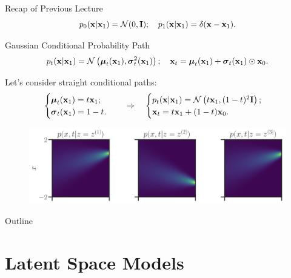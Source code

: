 \documentclass{beamer}
\begin{document}
\begin{frame}{Recap of Previous Lecture}
	\[
		p_0(\mathbf{x} | \mathbf{x}_1) = \mathcal{N}(0, \mathbf{I}); \quad p_1(\mathbf{x} | \mathbf{x}_1) = \delta(\mathbf{x} - \mathbf{x}_1).
	\]
	
	\begin{block}{Gaussian Conditional Probability Path}
		\vspace{-0.5cm}
		\[
			p_t(\mathbf{x} | \mathbf{x}_1) = \mathcal{N}\left(\boldsymbol{\mu}_t(\mathbf{x}_1), \boldsymbol{\sigma}_t^2(\mathbf{x}_1)\right); \quad \mathbf{x}_t = \boldsymbol{\mu}_t(\mathbf{x}_1) +  \boldsymbol{\sigma}_t(\mathbf{x}_1) \odot \mathbf{x}_0.
		\]
		\vspace{-0.6cm}
	\end{block}
	Let’s consider straight conditional paths:	
	\[
		\begin{cases}
			\boldsymbol{\mu}_t(\mathbf{x}_1) = t \mathbf{x}_1; \\
			\boldsymbol{\sigma}_t(\mathbf{x}_1) = 1 - t.
		\end{cases}
		\quad \Rightarrow \quad 
		\begin{cases}
			p_t(\mathbf{x} | \mathbf{x}_1) = \mathcal{N}\left(t \mathbf{x}_1, (1-t)^2 \mathbf{I}\right); \\
		 	\mathbf{x}_t = t \mathbf{x}_1 + (1 - t) \mathbf{x}_0. 
	 \end{cases}
	\]
	\vspace{-0.3cm}
	\begin{figure}
		\centering
		\includegraphics[width=\linewidth]{figs/conical_paths}
	\end{figure}
\end{frame}
\begin{frame}{Outline}
	\tableofcontents
\end{frame}
\section{Latent Space Models}
\end{document}
